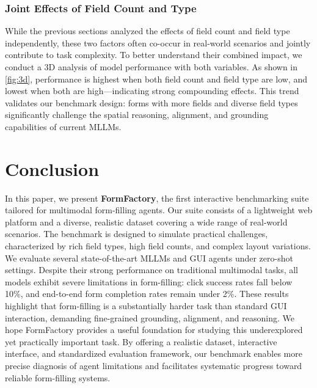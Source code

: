 \documentclass[sigconf, screen, review]{acmart}
\newcommand{\bobo}[1]{%
  \begin{CJK}{UTF8}{gbsn} %
  {\color{cyan}Bobo: #1}%
  \end{CJK}%
}
\begin{document}

\subsubsection{Joint Effects of Field Count and Type}
While the previous sections analyzed the effects of field count and field type independently, these two factors often co-occur in real-world scenarios and jointly contribute to task complexity.
To better understand their combined impact, we conduct a 3D analysis of model performance with both variables.
As shown in \cref{fig:3d}, performance is highest when both field count and field type are low, and lowest when both are high—indicating strong compounding effects. This trend validates our benchmark design: forms with more fields and diverse field types significantly challenge the spatial reasoning, alignment, and grounding capabilities of current MLLMs.

\section{Conclusion}
In this paper, we present \textbf{FormFactory}, the first interactive benchmarking suite tailored for multimodal form-filling agents.
Our suite consists of a lightweight web platform and a diverse, realistic dataset covering a wide range of real-world scenarios. 
The benchmark is designed to simulate practical challenges, characterized by rich field types, high field counts, and complex layout variations.
We evaluate several state-of-the-art MLLMs and GUI agents under zero-shot settings.
Despite their strong performance on traditional multimodal tasks, all models exhibit severe limitations in form-filling: click success rates fall below 10\%, and end-to-end form completion rates remain under 2\%.
These results highlight that form-filling is a substantially harder task than standard GUI interaction, demanding fine-grained grounding, alignment, and reasoning.
We hope FormFactory provides a useful foundation for studying this underexplored yet practically important task.
By offering a realistic dataset, interactive interface, and standardized evaluation framework, our benchmark enables more precise diagnosis of agent limitations and facilitates systematic progress toward reliable form-filling systems.
\end{document}
